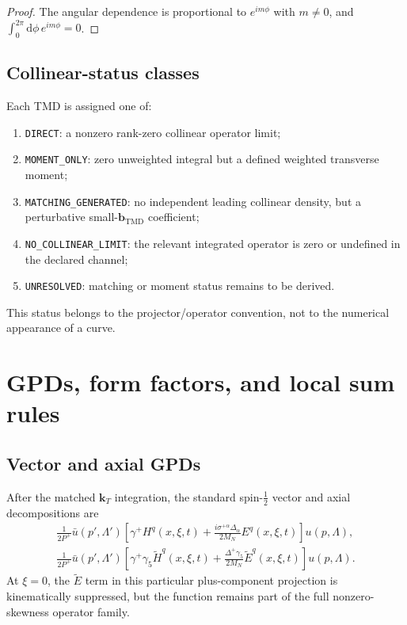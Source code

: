 \documentclass[11pt]{article}
\newcommand{\kT}{\bm{k}_{T}}
\newcommand{\bM}{\bm{b}_{\mathrm{TMD}}}
\newcommand{\dd}{\mathrm{d}}
\begin{document}
\begin{proof}
The angular dependence is proportional to \(e^{im\phi}\) with
\(m\ne0\), and
\(\int_0^{2\pi}\dd\phi\,e^{im\phi}=0\).
\end{proof}

\subsection{Collinear-status classes}

Each TMD is assigned one of:
\begin{enumerate}
\item \texttt{DIRECT}: a nonzero rank-zero collinear operator limit;
\item \texttt{MOMENT\_ONLY}: zero unweighted integral but a defined weighted
      transverse moment;
\item \texttt{MATCHING\_GENERATED}: no independent leading collinear density,
      but a perturbative small-\(\bM\) coefficient;
\item \texttt{NO\_COLLINEAR\_LIMIT}: the relevant integrated operator is zero
      or undefined in the declared channel;
\item \texttt{UNRESOLVED}: matching or moment status remains to be derived.
\end{enumerate}
This status belongs to the projector/operator convention, not to the
numerical appearance of a curve.

\section{GPDs, form factors, and local sum rules}
\label{sec:gpd-moments}

\subsection{Vector and axial GPDs}

After the matched \(\kT\) integration, the standard spin-\(\tfrac12\) vector
and axial decompositions are
\begin{align}
 \frac{1}{2P^+}\bar u(p',\Lambda')
 \left[\gamma^+H^q(x,\xi,t)
 +\frac{i\sigma^{+\alpha}\Delta_\alpha}{2M_N}E^q(x,\xi,t)
 \right]u(p,\Lambda),
\label{eq:vector-gpd-decomp}\\
 \frac{1}{2P^+}\bar u(p',\Lambda')
 \left[\gamma^+\gamma_5\widetilde H^q(x,\xi,t)
 +\frac{\Delta^+\gamma_5}{2M_N}\widetilde E^q(x,\xi,t)
 \right]u(p,\Lambda).
\label{eq:axial-gpd-decomp}
\end{align}
At \(\xi=0\), the \(\widetilde E\) term in this particular plus-component
projection is kinematically suppressed, but the function remains part of the
full nonzero-skewness operator family.
\end{document}
